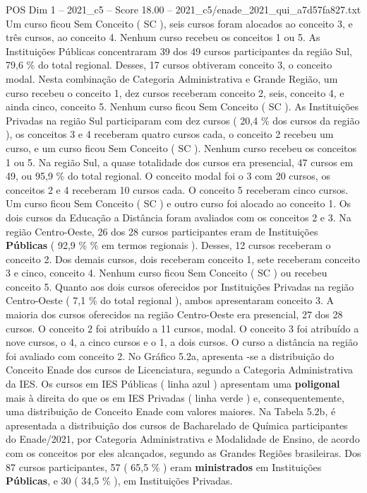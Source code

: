 \begin{textsample}{POS Dim 1 – 2021\_c5 – Score 18.00 – 2021\_c5/enade\_2021\_qui\_a7d57fa827.txt}
Um curso ficou Sem Conceito ( SC ), seis cursos foram alocados ao conceito 3, e três cursos, ao conceito 4.
Nenhum curso recebeu os conceitos 1 ou 5.
As Instituições Públicas concentraram 39 dos 49 cursos participantes da região Sul, 79,6 \% do total regional.
Desses, 17 cursos obtiveram conceito 3, o conceito modal.
Nesta combinação de Categoria Administrativa e Grande Região, um curso recebeu o conceito 1, dez cursos receberam conceito 2, seis, conceito 4, e ainda cinco, conceito 5.
Nenhum curso ficou Sem Conceito ( SC ).
As Instituições Privadas na região Sul participaram com dez cursos ( 20,4 \% dos cursos da região ), os conceitos 3 e 4 receberam quatro cursos cada, o conceito 2 recebeu um curso, e um curso ficou Sem Conceito ( SC ).
Nenhum curso recebeu os conceitos 1 ou 5.
Na região Sul, a quase totalidade dos cursos era presencial, 47 cursos em 49, ou 95,9 \% do total regional.
O conceito modal foi o 3 com 20 cursos, os conceitos 2 e 4 receberam 10 cursos cada.
O conceito 5 receberam cinco cursos.
Um curso ficou Sem Conceito ( SC ) e outro curso foi alocado ao conceito 1.
Os dois cursos da Educação a Distância foram avaliados com os conceitos 2 e 3.
Na região Centro-Oeste, 26 dos 28 cursos participantes eram de Instituições \textbf{Públicas} ( 92,9 \% \% em termos regionais ).
Desses, 12 cursos receberam o conceito 2.
Dos demais cursos, dois receberam conceito 1, sete receberam conceito 3 e cinco, conceito 4.
Nenhum curso ficou Sem Conceito ( SC ) ou recebeu conceito 5.
Quanto aos dois cursos oferecidos por Instituições Privadas na região Centro-Oeste ( 7,1 \% do total regional ), ambos apresentaram conceito 3.
A maioria dos cursos oferecidos na região Centro-Oeste era presencial, 27 dos 28 cursos.
O conceito 2 foi atribuído a 11 cursos, modal.
O conceito 3 foi atribuído a nove cursos, o 4, a cinco cursos e o 1, a dois cursos.
O curso a distância na região foi avaliado com conceito 2.
No Gráfico 5.2a, apresenta -se a distribuição do Conceito Enade dos cursos de Licenciatura, segundo a Categoria Administrativa da IES.
Os cursos em IES Públicas ( linha azul ) apresentam uma \textbf{poligonal} mais à direita do que os em IES Privadas ( linha verde ) e, consequentemente, uma distribuição de Conceito Enade com valores maiores.
Na Tabela 5.2b, é apresentada a distribuição dos cursos de Bacharelado de Química participantes do Enade/2021, por Categoria Administrativa e Modalidade de Ensino, de acordo com os conceitos por eles alcançados, segundo as Grandes Regiões brasileiras.
Dos 87 cursos participantes, 57 ( 65,5 \% ) eram \textbf{ministrados} em Instituições \textbf{Públicas}, e 30 ( 34,5 \% ), em Instituições Privadas.

\end{textsample}
